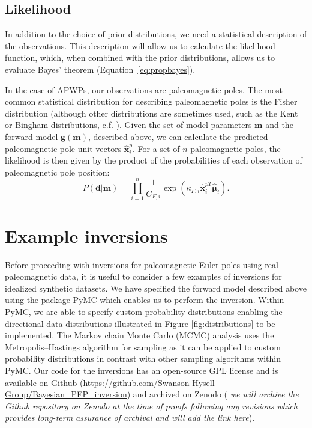 \documentclass[]{agujournal2019}
\begin{document}
\subsection*{Likelihood}
\label{sec:likelihood}
In addition to the choice of prior distributions, we need a statistical description of the observations. This description will allow us to calculate the likelihood function, which, when combined with the prior distributions, allows us to evaluate Bayes' theorem (Equation~\ref{eq:propbayes}).

In the case of APWPs, our observations are paleomagnetic poles. The most common statistical distribution for describing paleomagnetic poles is the Fisher distribution (although other distributions are sometimes used, such as the Kent or Bingham distributions, c.f. ). Given the set of model parameters $\mathbf{m}$ and the forward model $\mathbf{g}(\mathbf{m})$, described above, we can calculate the predicted paleomagnetic pole unit vectors $\hat{\mathbf{x}}_i^p$. For a set of $n$ paleomagnetic poles, the likelihood is then given by the product of the probabilities of each observation of paleomagnetic pole position:
\begin{equation}
P(\mathbf{d} \vert \mathbf{m}) = \displaystyle\prod_{i=1}^n \frac{1}{C_{F,i}} \exp \left( \kappa_{F,i} \hat{\mathbf{x}}_{i}^{pT} \hat{\mathbf{\mu}}_i \right).
\label{eq:model_likelihood}
\end{equation}

\section*{Example inversions}
\label{sec:example_inversion}

Before proceeding with inversions for paleomagnetic Euler poles using real paleomagnetic data, it is useful to consider a few examples of inversions for idealized synthetic datasets. We have specified the forward model described above using the package PyMC \cite{Salvatier2016a} which enables us to perform the inversion. Within PyMC, we are able to specify custom probability distributions enabling the directional data distributions illustrated in Figure \ref{fig:distributions} to be implemented. The Markov chain Monte Carlo (MCMC) analysis uses the Metropolis–Hastings algorithm for sampling as it can be applied to custom probability distributions in contrast with other sampling algorithms within PyMC. Our code for the inversions has an open-source GPL license and is available on Github (\url{https://github.com/Swanson-Hysell-Group/Bayesian_PEP_inversion}) and archived on Zenodo ( \textit{we will archive the Github repository on Zenodo at the time of proofs following any revisions which provides long-term assurance of archival and will add the link here}).
\end{document}
